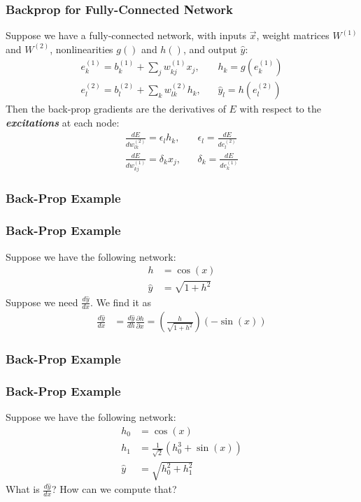 \documentclass{beamer}
\begin{document}
\begin{frame}
  \frametitle{Backprop for Fully-Connected Network}

  Suppose we have a fully-connected network, with inputs $\vec{x}$,
  weight matrices $W^{(1)}$ and $W^{(2)}$, nonlinearities $g()$ and
  $h()$, and output $\hat{y}$:
  \begin{align*}
    e_k^{(1)} = b_{k}^{(1)}+\sum_j w_{kj}^{(1)} x_j,&~~~~
    h_k = g\left(e_k^{(1)}\right)\\
    e_l^{(2)} = b_{l}^{(2)}+\sum_k w_{lk}^{(2)} h_k,&~~~~
    \hat{y}_l = h\left(e_l^{(2)}\right)
  \end{align*}
  Then the back-prop gradients are the derivatives of $E$ with respect
  to the {\bf\em excitations} at each node:
  \begin{align*}
    \frac{dE}{dw_{lk}^{(2)}} =\epsilon_lh_k,&~~~~\epsilon_l=\frac{dE}{de_l^{(2)}}\\
      \frac{dE}{dw_{kj}^{(1)}}=\delta_kx_j,&~~~~\delta_k=\frac{dE}{de_k^{(1)}}
  \end{align*}
\end{frame}

\begin{frame}
  \frametitle{Back-Prop Example}
  \centerline{}
\end{frame}

\begin{frame}
  \frametitle{Back-Prop Example}

  Suppose we have the following network:
  \begin{align*}
    h &= \cos(x)\\
    \hat{y} &= \sqrt{1+h^2}
  \end{align*}
  Suppose we need $\frac{d\hat{y}}{dx}$.  We find it as
  \begin{align*}
    \frac{d\hat{y}}{dx} &= \frac{d\hat{y}}{dh}\frac{\partial h}{\partial x}
    = \left(\frac{h}{\sqrt{1+h^2}}\right)\left(-\sin(x)\right)
  \end{align*}    
\end{frame}

\begin{frame}
  \frametitle{Back-Prop Example}
  \centerline{}
\end{frame}

\begin{frame}
  \frametitle{Back-Prop Example}

  Suppose we have the following network:
  \begin{align*}
    h_0 &= \cos(x)\\
    h_1 &= \frac{1}{\sqrt{2}}\left(h_0^3+\sin(x)\right)\\
    \hat{y} &= \sqrt{h_0^2+h_1^2}
  \end{align*}
  What  is $\frac{d\hat{y}}{dx}$?  How can we compute that?
\end{frame}
\end{document}
